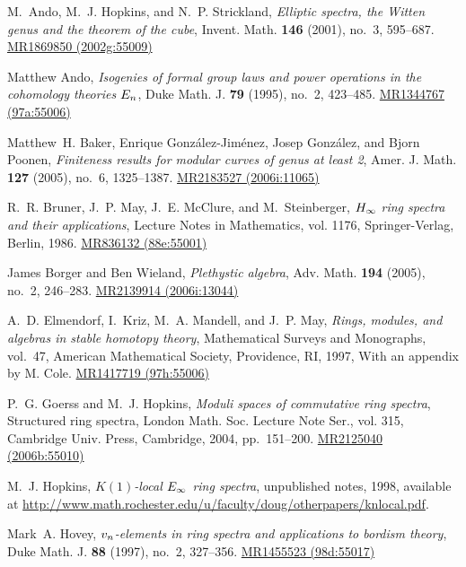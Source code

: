 \documentclass{gtpart}
\theoremstyle{definition}
\theoremstyle{remark}
\begin{document}
%
%

\newcommand{\MRn}[2]{\href{http://www.ams.org/mathscinet-getitem?mr=#1}{MR#1 #2}}
\begin{thebibliography}

M.~Ando, M.~J. Hopkins, and N.~P. Strickland, \emph{Elliptic spectra, the
  {W}itten genus and the theorem of the cube}, Invent. Math. \textbf{146}
  (2001), no.~3, 595--687. \MRn{1869850}{(2002g:55009)}

Matthew Ando, \emph{Isogenies of formal group laws and power operations in the
  cohomology theories {$E\sb n$}}, Duke Math. J. \textbf{79} (1995), no.~2,
  423--485. \MRn{1344767}{(97a:55006)}

Matthew~H. Baker, Enrique Gonz{\'a}lez-Jim{\'e}nez, Josep Gonz{\'a}lez, and
  Bjorn Poonen, \emph{Finiteness results for modular curves of genus at least
  2}, Amer. J. Math. \textbf{127} (2005), no.~6, 1325--1387. \MRn{2183527}{(2006i:11065)}

R.~R. Bruner, J.~P. May, J.~E. McClure, and M.~Steinberger, \emph{{$H\sb \infty
  $} ring spectra and their applications}, Lecture Notes in Mathematics, vol.
  1176, Springer-Verlag, Berlin, 1986. \MRn{836132}{(88e:55001)}

James Borger and Ben Wieland, \emph{Plethystic algebra}, Adv. Math.
  \textbf{194} (2005), no.~2, 246--283. \MRn{2139914}{(2006i:13044)}

A.~D. Elmendorf, I.~Kriz, M.~A. Mandell, and J.~P. May, \emph{Rings, modules,
  and algebras in stable homotopy theory}, Mathematical Surveys and Monographs,
  vol.~47, American Mathematical Society, Providence, RI, 1997, With an
  appendix by M. Cole. \MRn{1417719}{(97h:55006)}

P.~G. Goerss and M.~J. Hopkins, \emph{Moduli spaces of commutative ring
  spectra}, Structured ring spectra, London Math. Soc. Lecture Note Ser., vol.
  315, Cambridge Univ. Press, Cambridge, 2004, pp.~151--200. \MRn{2125040}{(2006b:55010)}

M.~J. Hopkins, \emph{{$K(1)$}-local {$E\sb \infty $} ring spectra}, unpublished
  notes, 1998, available at
  \url{http://www.math.rochester.edu/u/faculty/doug/otherpapers/knlocal.pdf}.

Mark~A. Hovey, \emph{{$v\sb n$}-elements in ring spectra and applications to
  bordism theory}, Duke Math. J. \textbf{88} (1997), no.~2, 327--356.
  \MRn{1455523}{(98d:55017)}


\end{thebibliography}
\end{document}

